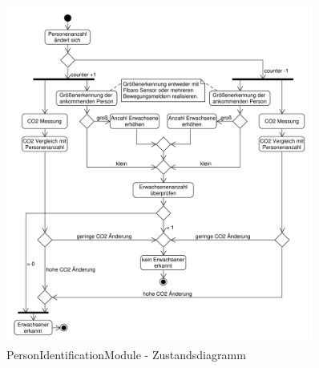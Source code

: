 \begin{figure}[h!]
	\centering
	\includegraphics[width=0.9\textwidth]{img/Modulkonzeption/PersonIdentificationStateMachine.pdf}
	\caption{PersonIdentificationModule - Zustandsdiagramm}
	\label{fig:personIdentification}
\end{figure}

